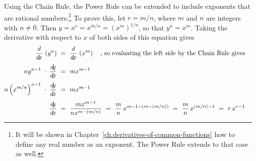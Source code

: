 Using the Chain Rule, the Power Rule can be extended to include exponents that
are rational numbers:\footnote{It will be shown in Chapter~\ref{ch:derivatives-of-common-functions} how to define any
real number as an exponent. The Power Rule extends to that case as well.}
To prove this, let $r = m/n$, where $m$ and $n$ are integers with $n \ne 0$.
Then $y = x^r = x^{m/n} = \left(x^m\right)^{1/n}$, so that $y^n = x^m$. Taking
the derivative with respect to $x$ of both sides of this equation gives
\begin{align*}
 \ddx\,\left(y^n\right) ~&=~ \ddx\,\left(x^m\right) \quad\text{, so evaluating the
                              left side by the Chain Rule gives}\\[4pt]
 n y^{n-1} \;\cdot\; \dydx ~&=~ m x^{m-1}\\[4pt]
 n \left(x^{m/n}\right)^{n-1} \;\cdot\; \dydx ~&=~ m x^{m-1}\\[4pt]
 \dydx ~&=~ \frac{m x^{m-1}}{n x^{m - (m/n)}} ~=~
            \frac{m}{n}\,x^{m - 1 - (m - (m/n))} ~=~ \frac{m}{n}\,x^{(m/n) - 1} ~=~
            r\,x^{r-1} \quad\checkmark
\end{align*}

